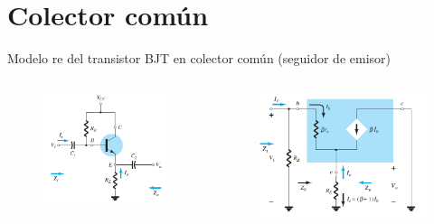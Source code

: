 \documentclass[t,aspectratio=169]{beamer}
\begin{document}
\section{Colector común}
\begin{frame}{Modelo re del transistor BJT en colector común (seguidor de emisor)}

\begin{columns}
\begin{column}{0.5\textwidth}

\begin{figure}[H]
    \centering
    \includegraphics[width=\textwidth]{figuras/modelo_re_colector_comun_1.png}
\end{figure}

\end{column}
\begin{column}{0.5\textwidth}

\begin{figure}[H]
    \centering
    \includegraphics[width=\textwidth]{figuras/modelo_re_colector_comun_2.png}
\end{figure}


\end{column}
\end{columns}
\end{frame}
\end{document}
